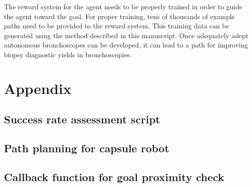 \documentclass[conference]{IEEEtran}
\begin{document}
The reward system for the agent needs to be properly trained in order to guide the agent
toward the goal. For proper training, tens of thousands of example paths need to be
provided to the reward system. This training data can be generated using the method
described in this manuscript. Once adequately adept autonomous bronchoscopes can be
developed, it can lead to a path for improving biopsy diagnostic yields in bronchoscopies. 

\section{Appendix}

\subsection{Success rate assessment script}



\subsection{Path planning for capsule robot}



\subsection{Callback function for goal proximity check}





\end{document}
